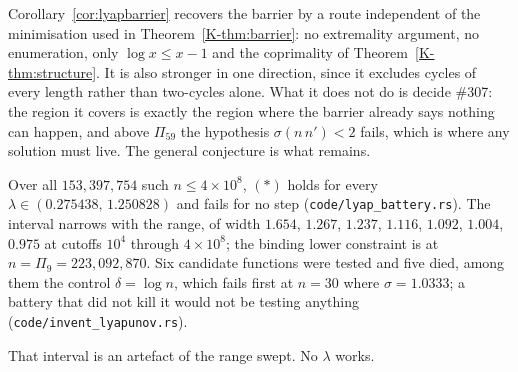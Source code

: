 \documentclass[11pt]{article}
\theoremstyle{definition}
\begin{document}
Corollary~\ref{cor:lyapbarrier} recovers the barrier by a route independent of the minimisation
used in Theorem~\ref{K-thm:barrier}: no extremality argument, no enumeration, only $\log x\le x-1$ and
the coprimality of Theorem~\ref{K-thm:structure}. It is also stronger in one direction, since it
excludes cycles of every length rather than two-cycles alone. What it does not do is decide
\#307: the region it covers is exactly the region where the barrier already says nothing can
happen, and above $\Pi_{59}$ the hypothesis $\sigma(n\,n')<2$ fails, which is where any solution
must live. The general conjecture is what remains.

Over all $153{,}397{,}754$ such $n\le4\times10^8$, $(\ast)$ holds for every
$\lambda\in(0.275438,\,1.250828)$ and fails for no step
\textup{(\texttt{code/lyap\_battery.rs})}. The interval narrows with the range, of width
$1.654$, $1.267$, $1.237$, $1.116$, $1.092$, $1.004$, $0.975$ at cutoffs $10^4$ through
$4\times10^8$;
the binding lower constraint is at $n=\Pi_9=223{,}092{,}870$. Six
candidate functions were tested and five died, among them the control $\delta=\log n$, which fails
first at $n=30$ where $\sigma=1.0333$; a battery that did not kill it would not be testing anything
\textup{(\texttt{code/invent\_lyapunov.rs})}.

That interval is an artefact of the range swept. No $\lambda$ works.
\end{document}
